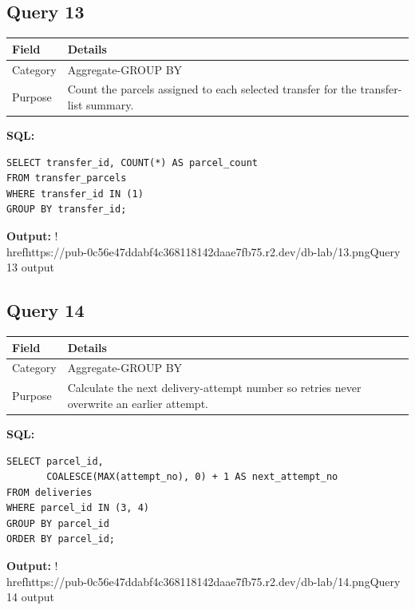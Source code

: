 \documentclass[11pt,a4paper]{article}
\begin{document}
\subsection{Query 13}
\begin{tabularx}{\linewidth}{>{\raggedright\arraybackslash}X|>{\raggedright\arraybackslash}X}
\hline
\textbf{Field} & \textbf{Details} \\ 
\hline
Category & Aggregate-GROUP BY \\ 
\hline
Purpose & Count the parcels assigned to each selected transfer for the transfer-list summary. \\ 
\hline
\end{tabularx}
\textbf{SQL:}
\begin{lstlisting}
SELECT transfer_id, COUNT(*) AS parcel_count
FROM transfer_parcels
WHERE transfer_id IN (1)
GROUP BY transfer_id;
\end{lstlisting}
\textbf{Output:}
!\\href{https://pub-0c56e47ddabf4c368118142daae7fb75.r2.dev/db-lab/13.png}{Query 13 output}
\subsection{Query 14}
\begin{tabularx}{\linewidth}{>{\raggedright\arraybackslash}X|>{\raggedright\arraybackslash}X}
\hline
\textbf{Field} & \textbf{Details} \\ 
\hline
Category & Aggregate-GROUP BY \\ 
\hline
Purpose & Calculate the next delivery-attempt number so retries never overwrite an earlier attempt. \\ 
\hline
\end{tabularx}
\textbf{SQL:}
\begin{lstlisting}
SELECT parcel_id,
       COALESCE(MAX(attempt_no), 0) + 1 AS next_attempt_no
FROM deliveries
WHERE parcel_id IN (3, 4)
GROUP BY parcel_id
ORDER BY parcel_id;
\end{lstlisting}
\textbf{Output:}
!\\href{https://pub-0c56e47ddabf4c368118142daae7fb75.r2.dev/db-lab/14.png}{Query 14 output}
\end{document}
